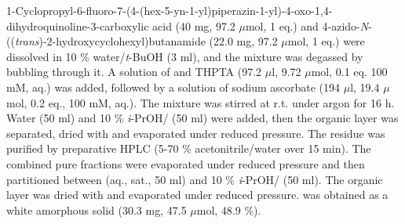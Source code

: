 1-Cyclopropyl-6-fluoro-7-(4-(hex-5-yn-1-yl)piperazin-1-yl)-4-oxo-1,4\hyp{}dihydro\-quinoline-3-carboxylic acid  (40 mg, 97.2 $\mu$mol, 1 eq.) and 4\hyp{}azido\hyp{}\textit{N}\hyp{}((\textit{trans})\hyp{}2\hyp{}hydroxycyclohexyl)butanamide   (22.0 mg, 97.2 $\mu$mol, 1 eq.) were dissolved in 10 \% water/\textit{t}-BuOH (3 ml), and the mixture was degassed by bubbling  through it. 
A solution of  and THPTA (97.2 $\mu$l, 9.72 $\mu$mol, 0.1 eq. 100 mM, aq.) was added, followed by a solution of sodium ascorbate (194 $\mu$l, 19.4 $\mu$mol, 0.2 eq., 100 mM, aq.). 
The mixture was stirred at r.t. under argon for 16 h. Water (50 ml) and 10 \% \textit{i}-PrOH/ (50 ml) were added, then the organic layer was separated, dried with  and evaporated under reduced pressure. The residue was purified by preparative HPLC (5-70 \% acetonitrile/water over 15 min). 
The combined pure fractions were evaporated under reduced pressure and then partitioned between  (aq., sat., 50 ml) and 10 \% \textit{i}-PrOH/ (50 ml). The organic layer was dried with  and evaporated under reduced pressure.
 was obtained as a white amorphous solid (30.3 mg, 47.5 $\mu$mol, 48.9 \%).
\\[1\baselineskip]
\\[1\baselineskip]
